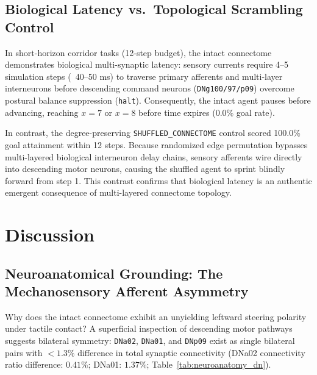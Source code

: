 \documentclass[10pt,letterpaper]{article}
\begin{document}
\subsection{Biological Latency vs.\ Topological Scrambling Control}

In short-horizon corridor tasks (12-step budget), the intact connectome demonstrates biological multi-synaptic latency: sensory currents require 4--5 simulation steps (~40--50 ms) to traverse primary afferents and multi-layer interneurons before descending command neurons (\texttt{DNg100/97/p09}) overcome postural balance suppression (\texttt{halt}). Consequently, the intact agent pauses before advancing, reaching $x=7$ or $x=8$ before time expires (0.0\% goal rate).

In contrast, the degree-preserving \texttt{SHUFFLED\_CONNECTOME} control scored 100.0\% goal attainment within 12 steps. Because randomized edge permutation bypasses multi-layered biological interneuron delay chains, sensory afferents wire directly into descending motor neurons, causing the shuffled agent to sprint blindly forward from step 1. This contrast confirms that biological latency is an authentic emergent consequence of multi-layered connectome topology.

\section{Discussion}

\subsection{Neuroanatomical Grounding: The Mechanosensory Afferent Asymmetry}

Why does the intact connectome exhibit an unyielding leftward steering polarity under tactile contact? A superficial inspection of descending motor pathways suggests bilateral symmetry: \texttt{DNa02}, \texttt{DNa01}, and \texttt{DNp09} exist as single bilateral pairs with $< 1.3\%$ difference in total synaptic connectivity (DNa02 connectivity ratio difference: $0.41\%$; DNa01: $1.37\%$; Table~\ref{tab:neuroanatomy_dn}).
\end{document}
